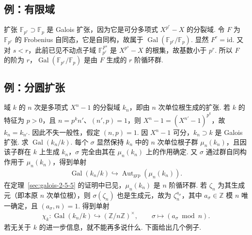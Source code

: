 \subsection{例：有限域}\label{sec:galois-2-7-3}
\begin{example*}扩张 $\mathbb F_{p^r}\supset\mathbb F_p$ 是 Galois 扩张，因为它是可分多项式 $X^{p^r}-X$ 的分裂域. 令 $F$ 为 $\mathbb F_{p^r}$ 的 Frobenius 自同态，它是自同构，故属于 $\operatorname{Gal}(\mathbb F_{p^r}/\mathbb F_p)$. 显然 $F^r=\mathrm{id}$. 又对 $s<r$，此前已见不动点子域 $\mathbb F_{p^r}^{F^s}$ 是 $X^{p^s}-X$ 的根集，故基数小于 $p^r$. 所以 $F$ 的阶为 $r$，$\operatorname{Gal}(\mathbb F_{p^r}/\mathbb F_p)$ 是由 $F$ 生成的 $r$ 阶循环群.\end{example*}
\subsection{例：分圆扩张}\label{sec:galois-2-7-4}
域 $k$ 的 $n$ 次是多项式 $X^n-1$ 的分裂域 $k_n$，即由 $n$ 次单位根生成的扩张. 若 $k$ 的特征为 $p>0$，且 $n=p^kn'$、$(n',p)=1$，则 $X^n-1=(X^{n'}-1)^{p^k}$，故 $k_n=k_{n'}$. 因此不失一般性，假定 $(n,p)=1$. 因 $X^n-1$ 可分，$k_n\supset k$ 是 Galois 扩张. 求 $\operatorname{Gal}(k_n/k)$. 每个 $\sigma$ 显然保持 $k_n$ 中的 $n$ 次单位根子群 $\mu_n(k_n)$，且因该子群在 $k$ 上生成 $k_n$，$\sigma$ 完全由其在 $\mu_n(k_n)$ 上的作用确定. 又 $\sigma$ 通过群自同构作用于 $\mu_n(k_n)$，得到单射
\begin{align*}
\operatorname{Gal}(k_n/k)\hookrightarrow\operatorname{Aut}_{\mathrm{grp}}(\mu_n(k_n)).
\end{align*}
在定理~\ref{sec:galois-2-5-5} 的证明中已见，$\mu_n(k_n)$ 是 $n$ 阶循环群. 若 $\zeta_n$ 为其生成元（即本原 $n$ 次单位根），则 $\sigma(\zeta_n)$ 也是生成元，故为 $\zeta_n^{a_\sigma}$，其中 $a_\sigma\in\mathbb Z$ 模 $n$ 唯一确定，且 $(a_\sigma,n)=1$. 得到单射
\begin{align*}
\chi_k:\operatorname{Gal}(k_n/k)\hookrightarrow(\mathbb Z/n\mathbb Z)^\times,\qquad\sigma\mapsto(a_\sigma\bmod n).
\end{align*}
若无关于 $k$ 的进一步信息，就不能再多说什么. 下面给出几个例子.
